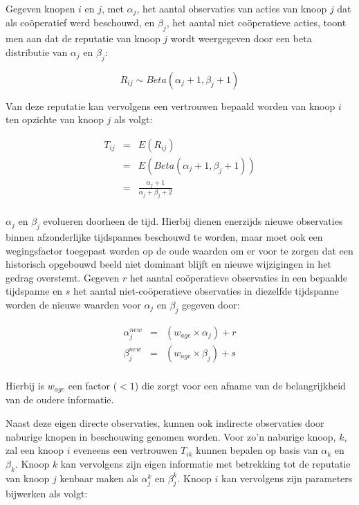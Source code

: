 Gegeven knopen $i$ en $j$, met $\alpha_j$, het aantal observaties van acties van
knoop $j$ dat als co\"operatief werd beschouwd, en $\beta_j$, het aantal niet
co\"operatieve acties, toont men aan dat de reputatie van knoop $j$ wordt
weergegeven door een beta distributie van $\alpha_j$ en $\beta_j$:

\begin{equation} \label{eq:reputation-beta}
R_{ij} \sim Beta(\alpha_j+1, \beta_j+1)
\end{equation}

Van deze reputatie kan vervolgens een vertrouwen bepaald worden van knoop $i$
ten opzichte van knoop $j$ als volgt: 

\begin{equation} \label{eq:reputation-trust}
\begin{array}{rcl}
T_{ij} & = & E(R_{ij}) \\
       & = & E(Beta(\alpha_j+1, \beta_j+1)) \\
       & = & \frac{\alpha_j+1}{\alpha_j+\beta_j+2} \\
\end{array}
\end{equation}

$\alpha_j$ en $\beta_j$ evolueren doorheen de tijd. Hierbij dienen enerzijds
nieuwe observaties binnen afzonderlijke tijdspannes beschouwd te worden, maar
moet ook een wegingsfactor toegepast worden op de oude waarden om er voor te
zorgen dat een historisch opgebouwd beeld niet dominant blijft en nieuwe
wijzigingen in het gedrag overstemt. Gegeven $r$ het aantal co\"operatieve
observaties in een bepaalde tijdspanne en $s$ het aantal niet-co\"operatieve
observaties in diezelfde tijdspanne worden de nieuwe waarden voor $\alpha_j$ en
$\beta_j$ gegeven door:

\begin{equation} \label{eq:reputation-update-direct}
\begin{array}{rcl}
\alpha^{new}_j & = & (w_{age} \times \alpha_j) + r \\
\beta^{new}_j  & = & (w_{age} \times \beta_j) + s \\
\end{array}
\end{equation}

Hierbij is $w_{age}$ een factor ($< 1$) die zorgt voor een afname van de
belangrijkheid van de oudere informatie.

Naast deze eigen directe observaties, kunnen ook indirecte observaties door
naburige knopen in beschouwing genomen worden. Voor zo'n naburige knoop, $k$,
zal een knoop $i$ eveneens een vertrouwen $T_{ik}$ kunnen bepalen op basis van
$\alpha_k$ en $\beta_k$. Knoop $k$ kan vervolgens zijn eigen informatie met
betrekking tot de reputatie van knoop $j$ kenbaar maken als $\alpha^k_j$ en
$\beta^k_j$. Knoop $i$ kan vervolgens zijn parameters bijwerken als volgt:

